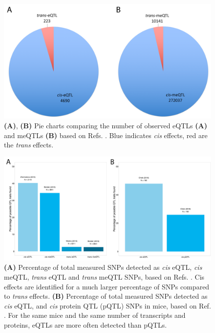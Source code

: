 \begin{figure}[h!]
	\includegraphics[scale=0.05]{chapters/chapter2-genetic-architecture/img/Figure2.png}
	\caption{\textbf{(A)}, \textbf{(B)} Pie charts comparing the number of observed eQTLs \textbf{(A)} and meQTLs \textbf{(B)} based on Refs. \cite{zhernakovaIdentificationContextdependentExpression2017,wongInterplayCisTrans2017}. Blue indicates \emph{cis} effects, red are the \emph{trans} effects.}
\end{figure}

\begin{figure}[h!]
	\includegraphics[scale=0.3]{chapters/chapter2-genetic-architecture/img/Figure3.png}
	\caption{\textbf{(A)} Percentage of total measured SNPs detected as \emph{cis} eQTL, \emph{cis} meQTL, \emph{trans} eQTL and \emph{trans} meQTL SNPs, based on Refs. \cite{zhernakovaIdentificationContextdependentExpression2017,gibsonExpressionQuantitativeTrait2015,wongInterplayCisTrans2017}. Cis effects are identified for a much larger percentage of SNPs compared to \emph{trans} effects. \textbf{(B)} Percentage of total measured SNPs detected as \emph{cis} eQTL, and \emph{cis} protein QTL (pQTL) SNPs in mice, based on Ref. \cite{GenomeWideMetabolicQTL}. For the same mice and the same number of transcripts and proteins, eQTLs are more often detected than pQTLs.}
\end{figure}

